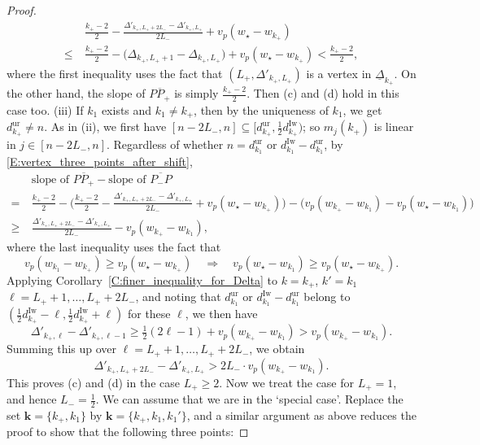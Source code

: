 \begin{proof}
    \begin{align*}
    &\frac{k_+-2}2  -\frac{ \Delta'_{k_+, L_++2L_-} - \Delta'_{k_+, L_+}}{2L_-} + v_p(w_\star- w_{k_+})
    \\
    \leq\ & \frac{k_+-2}2 - \big(\Delta_{k_+, L_++1}- \Delta_{k_+, L_+}\big) + v_p(w_\star - w_{k_+}) < \frac{k_+-2}2,
    \end{align*}
    where the first inequality uses the fact that $(L_+, \Delta'_{k_+, L_+})$ is a vertex in $\underline \Delta_{k_+}$. On the other hand, the slope of $\overline{PP_+}$ is simply $\frac{k_+-2}2$. Then (c) and (d) hold in this case too.
    (iii) If $k_1$ exists and $k_1 \neq k_+$, then by the uniqueness of $k_1$, we get $d_{k_+}^{\mathrm{ur}}\neq n$. As in (ii), we first have $[n-2L_-, n]\subseteq [d_{k_+}^{\mathrm{ur}}, \tfrac 12 d_{k_+}^{\mathrm{Iw}})$; so $m_j(k_+)$ is linear in $j \in [n-2L_-,n]$.
    Regardless of whether  $n=d_{k_1}^{{\mathrm{ur}}}$ or $d_{k_1}^{\mathrm{Iw}}-d_{k_1}^{\mathrm{ur}}$,  by \eqref{E:vertex_three_points_after_shift},
    \begin{align*}
    &\textrm{slope of }\overline{PP_+}  - \textrm{slope of }\overline{P_-P}
    \\
    =\ & \frac{k_+-2}2 - \Big( \frac{k_+-2}2  -\frac{\Delta'_{k_+, L_++2L_-} - \Delta'_{k_+, L_+}}{2L_-} +v_p(w_\star-w_{k_+})\Big) - \big(v_p(w_{k_+}-w_{k_1})- v_p(w_\star-w_{k_1})  \big)
    \\
    \geq \ &\frac{\Delta'_{k_+, L_++2L_-} - \Delta'_{k_+, L_+}}{2L_-} - v_p(w_{k_+}-w_{k_1}),
    \end{align*}
    where the last inequality uses the fact that $$v_p(w_{k_1} - w_{k_+}) \geq  v_p(w_\star-w_{k_+})\quad \Rightarrow \quad v_p(w_\star - w_{k_1}) \geq  v_p(w_\star-w_{k_+}).$$
    Applying Corollary~\ref{C:finer_inequality_for_Delta} to $k = k_+$, $k'=k_1$ $\ell = L_++1, \dots, L_++2L_-$, and noting that $d_{k_1}^{\mathrm{ur}}$ or $d_{k_1}^{\mathrm{Iw}}-d_{k_1}^{\mathrm{ur}}$ belong to $(\frac 12d_{k_+}^{\mathrm{Iw}}- \ell, \frac 12d_{k_+}^{\mathrm{Iw}}+\ell)$ for these $\ell$, we then have
    $$
    \Delta'_{k_+, \ell} - \Delta'_{k_+, \ell-1} \geq \tfrac 12(2\ell-1) + v_p(w_{k_{+}} - w_{k_1})>v_p(w_{k_{+}} - w_{k_1}).
    $$
    Summing this up over $\ell = L_++1, \dots, L_++2L_-$, we obtain
    $$
    \Delta'_{k_+, L_++2L_-} - \Delta'_{k_+, L_+} > 2L_- \cdot v_p(w_{k_{+}} - w_{k_1}).
    $$
    This proves (c) and (d) in the case $L_+\geq 2$.
    Now we treat the case for $L_+=1$, and hence $L_-=\frac 12$. We can assume that we are in the `special case'. Replace the set ${\mathbf{k}}=\{k_+,k_1 \}$ by ${\mathbf{k}}=\{k_+,k_1,k_1' \}$, and a similar argument as above reduces the proof to show that the following three points:

\end{proof}

